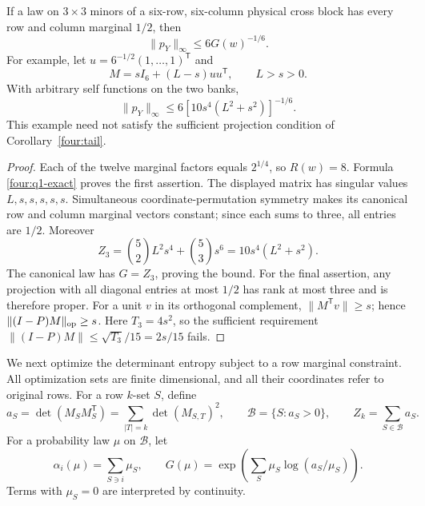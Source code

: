 \begin{proposition}
\label{four:balanced-six}
If a law on \(3\times3\) minors of a six-row, six-column
physical cross block has every row and column marginal \(1/2\),
then
\[
 \|p_Y\|_\infty\leq6G(w)^{-1/6}.
\]
For example, let \(u=6^{-1/2}(1,\ldots,1)^{\mathsf T}\) and
\[
 M=sI_6+(L-s)uu^{\mathsf T},\qquad L>s>0.
\]
With arbitrary self functions on the two banks,
\begin{equation}\label{four:balanced-six-bound}
 \|p_Y\|_\infty
 \leq6[10s^4(L^2+s^2)]^{-1/6}.
\end{equation}
This example need not satisfy the sufficient projection condition
of Corollary~\ref{four:tail}.
\end{proposition}
\begin{proof}
Each of the twelve marginal factors equals \(2^{1/4}\),
so \(R(w)=8\).  Formula \eqref{four:q1-exact} proves the
first assertion.
The displayed matrix has singular values \(L,s,s,s,s,s\).
Simultaneous coordinate-permutation symmetry makes its canonical
row and column marginal vectors constant; since each sums to
three, all entries are \(1/2\).  Moreover
\[
 Z_3=\binom52 L^2s^4+\binom53s^6
     =10s^4(L^2+s^2).
\]
The canonical law has \(G=Z_3\), proving the bound.
For the final assertion, any projection with all diagonal entries
at most \(1/2\) has rank at most three and is therefore proper.
For a unit \(v\) in its orthogonal complement,
\(\|M^{\mathsf T}v\|\geq s\); hence
\(\|(I-P)M\|_{\rm op}\geq s\).
Here \(T_3=4s^2\), so the sufficient requirement
\(\|(I-P)M\|\leq\sqrt{T_3}/15=2s/15\) fails.
\end{proof}

We next optimize the determinant entropy subject to a row
marginal constraint.  All optimization sets are finite
dimensional, and all their coordinates refer to original rows.
For a row \(k\)-set \(S\), define
\[
 a_S=\det(M_SM_S^{\mathsf T})
     =\sum_{|T|=k}\det(M_{S,T})^2,\qquad
 \mathcal B=\{S:a_S>0\},\qquad Z_k=\sum_{S\in\mathcal B}a_S.
\]
For a probability law \(\mu\) on \(\mathcal B\), let
\[
 \alpha_i(\mu)=\sum_{S\ni i}\mu_S,\qquad
 G(\mu)=\exp\left(\sum_S\mu_S\log(a_S/\mu_S)\right).
\]
Terms with \(\mu_S=0\) are interpreted by continuity.

